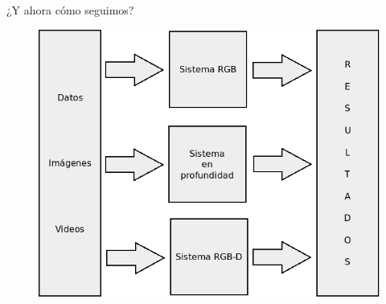 \documentclass[]{beamer}
\begin{document}
\subsection*{}
\begin{frame}{¿Y ahora cómo seguimos?}


    \begin{figure}[t]
        \centering
        \includegraphics[scale=0.4]{img/diagrama_datos_sistema/datos_sistemas.png}
    \end{figure}

\end{frame}
\end{document}
